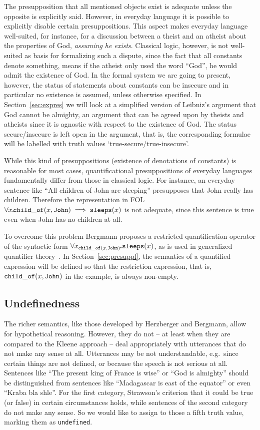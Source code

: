 \documentclass{\filespath jancl}
\def\sdot{\rule{.3ex}{.3ex}\hspace{-0.4ex}\;}
\newcommand{\all}[3]{\forall {#1}_{#2}\sdot #3}
\begin{document}
The presupposition that all mentioned objects exist is adequate unless
the opposite is explicitly said.  However, in everyday language it is
possible to explicitly disable certain presuppositions. This aspect
makes everyday language well-suited, for instance, for a discussion
between a theist and an atheist about the properties of God, {\em
  assuming he exists}.  Classical logic, however, is not well-suited
as basis for formalizing such a dispute, since the fact that all
constants denote something, means if the atheist only used the word
``God'', he would admit the existence of God. In the formal system we
are going to present, however, the status of statements about
constants can be insecure and in particular no existence is assumed,
unless otherwise specified. In Section~\ref{sec:expres} we will look
at a simplified version of Leibniz's argument that God cannot be
almighty, an argument that can be agreed upon by theists and atheists
since it is agnostic with respect to the existence of God. The status
secure/insecure is left open in the argument, that is, the
corresponding formulae will be labelled with truth values
`true-secure/true-insecure'.

While this kind of presuppositions (existence of denotations of constants) is reasonable for most cases,
quantificational presuppositions of everyday languages fundamentally differ from those in
classical logic.  For instance, an everyday sentence like ``All children of John are
sleeping'' presupposes that John really has children. Therefore the representation in FOL
$\all{x}{}{{\tt\!  child\_of}(x,{\tt John}) \implies {\tt sleeps}(x)}$ is not adequate,
since this sentence is true even when John has no children at all.

To overcome this problem Bergmann proposes a restricted quantification
operator of the syntactic form $\all{x}{{\tt child\_of}(x,{\tt
    John})}{{\tt sleeps}(x)}$, as is used in generalized quantifier
theory~\cite{BarCoo:gqnl81,Mostowski57}.  In Section~\ref{sec:presuppl}, the
semantics of a quantified expression will be defined so that the restriction
expression, that is, ${\tt child\_of}(x,{\tt John})$ in the example, is always
non-empty.

\subsection{Undefinedness}\label{subsec:undefinedness}
The richer semantics, like those developed by Herzberger and Bergmann,
allow for hypothetical reasoning. However, they do not -- at least
when they are compared to the Kleene approach -- deal appropriately
with utterances that do not make any sense at all. Utterances may
be not understandable, e.g.\ since certain things are not defined, or
because the speech is not serious at all.  Sentences like ``The
present king of France is wise'' or ``God is almighty'' should be
distinguished from sentences like ``Madagascar is east of the
equator'' or even ``Kraba bla shle''.  For the first category,
Strawson's criterion that it could be true (or false) in certain
circumstances holds, while sentences of the second category do not
make any sense.  So we would like to assign to those a fifth truth
value, marking them as {\tt undefined}. 
\end{document}
